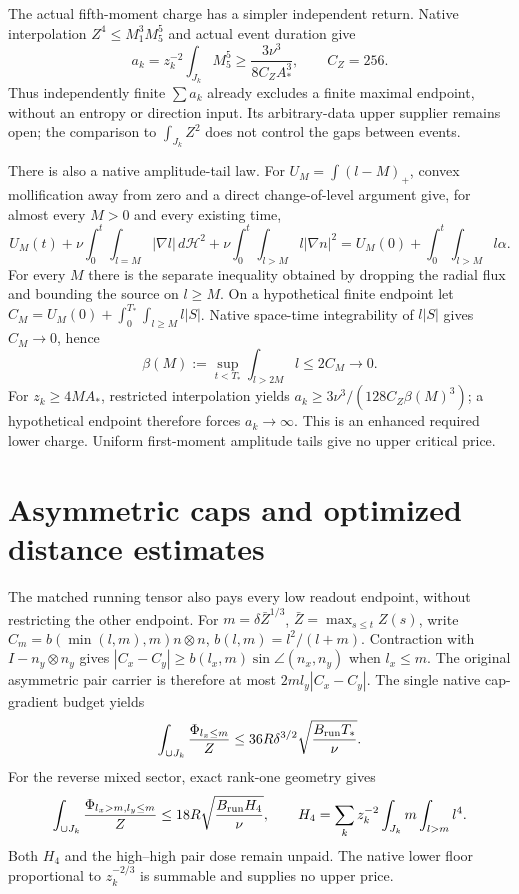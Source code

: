 \documentclass[11pt]{article}
\begin{document}
The actual fifth-moment charge has a simpler independent return.
Native interpolation $Z^4\le M_1^3M_5^5$ and actual event duration give
\[
 a_k=z_k^{-2}\int_{J_k}M_5^5
       \ge\frac{3\nu^3}{8C_ZA_*^3},\qquad C_Z=256.
\]
Thus independently finite $\sum a_k$ already excludes a finite maximal
endpoint, without an entropy or direction input. Its arbitrary-data
upper supplier remains open; the comparison to $\int_{J_k}Z^2$ does not
control the gaps between events.

There is also a native amplitude-tail law. For $U_M=\int(l-M)_+$,
convex mollification away from zero and a direct change-of-level argument
give, for almost every $M>0$ and every existing time,
\[
 U_M(t)+\nu\int_0^t\!\int_{l=M}|\nabla l|\,d\mathcal H^2
       +\nu\int_0^t\!\int_{l>M}l|\nabla n|^2
 =U_M(0)+\int_0^t\!\int_{l>M}l\alpha.
\]
For every $M$ there is the separate inequality obtained by dropping
the radial flux and bounding the source on $l\ge M$.
On a hypothetical finite endpoint let
$C_M=U_M(0)+\int_0^{T_*}\int_{l\ge M}l|S|$.
Native space-time integrability of $l|S|$ gives $C_M\to0$, hence
\[
 \beta(M):=\sup_{t<T_*}\int_{l>2M}l\le2C_M\longrightarrow0.
\]
For $z_k\ge4MA_*$, restricted interpolation yields
$a_k\ge3\nu^3/(128C_Z\beta(M)^3)$; a hypothetical endpoint therefore
forces $a_k\to\infty$. This is an enhanced required lower charge.
Uniform first-moment amplitude tails give no upper critical price.

\section{Asymmetric caps and optimized distance estimates}
The matched running tensor also pays every low readout endpoint,
without restricting the other endpoint. For $m=\delta\bar Z^{1/3}$,
$\bar Z=\max_{s\le t}Z(s)$, write $C_m=b(\min(l,m),m)n\otimes n$,
$b(l,m)=l^2/(l+m)$. Contraction with $I-n_y\otimes n_y$ gives
$|C_x-C_y|\ge b(l_x,m)\sin\angle(n_x,n_y)$ when $l_x\le m$.
The original asymmetric pair carrier is therefore at most
$2m l_y|C_x-C_y|$. The single native cap-gradient budget yields
\[
 \int_{\cup J_k}\frac{\Phi_{l_x\le m}}Z
 \le36R\delta^{3/2}\sqrt{\frac{B_{\rm run}T_*}{\nu}}.
\]
For the reverse mixed sector, exact rank-one geometry gives
\[
 \int_{\cup J_k}\frac{\Phi_{l_x>m,l_y\le m}}Z
 \le18R\sqrt{\frac{B_{\rm run}H_4}{\nu}},\qquad
 H_4=\sum_kz_k^{-2}\int_{J_k}m\int_{l>m}l^4.
\]
Both $H_4$ and the high--high pair dose remain unpaid. The native lower
floor proportional to $z_k^{-2/3}$ is summable and supplies no upper price.
\end{document}
